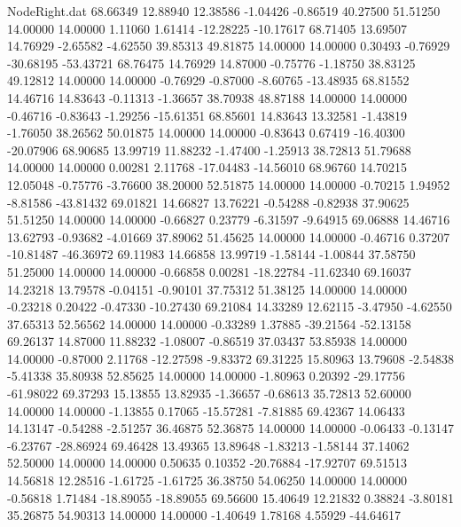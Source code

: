 \begin{filecontents}{NodeRight.dat}
  68.66349   12.88940   12.38586    -1.04426   -0.86519   40.27500   51.51250   14.00000   14.00000    1.11060    1.61414  -12.28225  -10.17617
  68.71405   13.69507   14.76929    -2.65582   -4.62550   39.85313   49.81875   14.00000   14.00000    0.30493   -0.76929  -30.68195  -53.43721
  68.76475   14.76929   14.87000    -0.75776   -1.18750   38.83125   49.12812   14.00000   14.00000   -0.76929   -0.87000   -8.60765  -13.48935
  68.81552   14.46716   14.83643    -0.11313   -1.36657   38.70938   48.87188   14.00000   14.00000   -0.46716   -0.83643   -1.29256  -15.61351
  68.85601   14.83643   13.32581    -1.43819   -1.76050   38.26562   50.01875   14.00000   14.00000   -0.83643    0.67419  -16.40300  -20.07906
  68.90685   13.99719   11.88232    -1.47400   -1.25913   38.72813   51.79688   14.00000   14.00000    0.00281    2.11768  -17.04483  -14.56010
  68.96760   14.70215   12.05048    -0.75776   -3.76600   38.20000   52.51875   14.00000   14.00000   -0.70215    1.94952   -8.81586  -43.81432
  69.01821   14.66827   13.76221    -0.54288   -0.82938   37.90625   51.51250   14.00000   14.00000   -0.66827    0.23779   -6.31597   -9.64915
  69.06888   14.46716   13.62793    -0.93682   -4.01669   37.89062   51.45625   14.00000   14.00000   -0.46716    0.37207  -10.81487  -46.36972
  69.11983   14.66858   13.99719    -1.58144   -1.00844   37.58750   51.25000   14.00000   14.00000   -0.66858    0.00281  -18.22784  -11.62340
  69.16037   14.23218   13.79578    -0.04151   -0.90101   37.75312   51.38125   14.00000   14.00000   -0.23218    0.20422   -0.47330  -10.27430
  69.21084   14.33289   12.62115    -3.47950   -4.62550   37.65313   52.56562   14.00000   14.00000   -0.33289    1.37885  -39.21564  -52.13158
  69.26137   14.87000   11.88232    -1.08007   -0.86519   37.03437   53.85938   14.00000   14.00000   -0.87000    2.11768  -12.27598   -9.83372
  69.31225   15.80963   13.79608    -2.54838   -5.41338   35.80938   52.85625   14.00000   14.00000   -1.80963    0.20392  -29.17756  -61.98022
  69.37293   15.13855   13.82935    -1.36657   -0.68613   35.72813   52.60000   14.00000   14.00000   -1.13855    0.17065  -15.57281   -7.81885
  69.42367   14.06433   14.13147    -0.54288   -2.51257   36.46875   52.36875   14.00000   14.00000   -0.06433   -0.13147   -6.23767  -28.86924
  69.46428   13.49365   13.89648    -1.83213   -1.58144   37.14062   52.50000   14.00000   14.00000    0.50635    0.10352  -20.76884  -17.92707
  69.51513   14.56818   12.28516    -1.61725   -1.61725   36.38750   54.06250   14.00000   14.00000   -0.56818    1.71484  -18.89055  -18.89055
  69.56600   15.40649   12.21832     0.38824   -3.80181   35.26875   54.90313   14.00000   14.00000   -1.40649    1.78168    4.55929  -44.64617

\end{filecontents}
